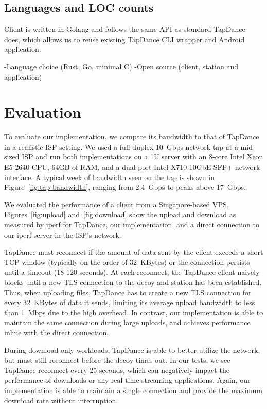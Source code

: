 \documentclass[letterpaper,twocolumn,10pt]{article}
\newcommand{\TODO}[1]{\hl{TODO: #1}\xspace}
\begin{document}
\subsection{Languages and LOC counts} %
Client is written in Golang and follows the same API as standard TapDance does,
which allows us to reuse existing TapDance CLI wrapper and Android application.

-Language choice (Rust, Go, minimal C)
-Open source (client, station and application)
\fi


\section{Evaluation}
\label{sec:evaluation}



\FigTapBandwidth

\FigUpload

\FigDownload

To evaluate our \scheme implementation, we compare its bandwidth
to that of TapDance in a realistic ISP setting. We used a full duplex 10~Gbps
network tap at a mid-sized ISP and run both implementations on a 1U server with
an 8-core Intel Xeon E5-2640 CPU, 64GB of RAM, and a dual-port Intel X710 10GbE SFP+
network interface. A typical week of bandwidth seen on the tap is
shown in Figure~\ref{fig:tap-bandwidth}, ranging from 2.4~Gbps to peaks above
17~Gbps.


We evaluated the performance of a client from a Singapore-based VPS,
Figures~\ref{fig:upload} and~\ref{fig:download} show the upload and download as
measured by iperf for TapDance, our \scheme implementation, and a direct
connection to our iperf server in the ISP's network.

TapDance must reconnect if the amount of data sent by the client
exceeds a short TCP window (typically on the order of 32~KBytes) or the
connection persists until a timeout (18-120 seconds). At each reconnect, the
TapDance client naively blocks until a new TLS connection to the decoy and
station has been established. Thus, when uploading files, TapDance has to create
a new TLS connection for every 32~KBytes of data it sends, limiting its average
upload bandwidth to less than 1~Mbps due to the high overhead. In contrast,
our \scheme implementation is
able to maintain the same connection during large uploads, and achieves
performance inline with the direct connection.

During download-only workloads, TapDance is able to better utilize the network,
but must still reconnect before the decoy times out. In our tests, we see
TapDance reconnect every 25 seconds, which can negatively impact the performance of
downloads or any real-time streaming applications. Again, our \scheme
implementation is able to maintain a single connection and provide the maximum
download rate without interruption.
\end{document}
